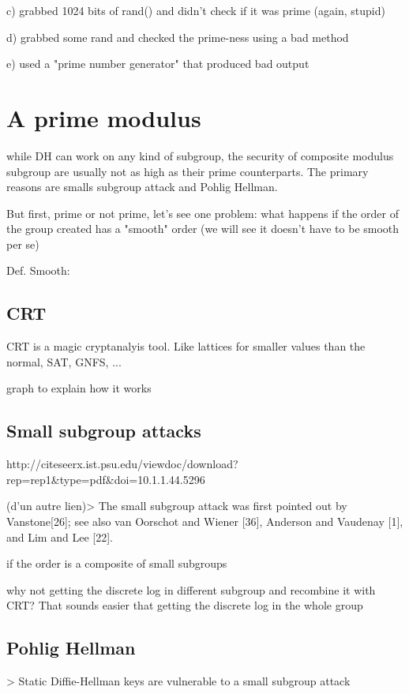 \documentclass[a4paper,11pt]{article}
\begin{document}
c) grabbed 1024 bits of rand() and didn't check if it was prime (again, stupid)

d) grabbed some rand and checked the prime-ness using a bad method

e) used a "prime number generator" that produced bad output


\section{A prime modulus}

while DH can work on any kind of subgroup, the security of composite modulus subgroup are usually not as high as their prime counterparts. The primary reasons are smalls subgroup attack and Pohlig Hellman.

But first, prime or not prime, let's see one problem: what happens if the order of the group created has a "smooth" order (we will see it doesn't have to be smooth per se)

Def. Smooth:

\subsection{CRT}

CRT is a magic cryptanalyis tool. Like lattices for smaller values than the normal, SAT, GNFS, ...

graph to explain how it works

\subsection{Small subgroup attacks}

http://citeseerx.ist.psu.edu/viewdoc/download?rep=rep1&type=pdf&doi=10.1.1.44.5296

(d'un autre lien)> The small subgroup attack was first pointed out by Vanstone[26]; see also van Oorschot and Wiener [36], Anderson and Vaudenay [1], and Lim and Lee [22].

if the order is a composite of small subgroups

why not getting the discrete log in different subgroup and recombine it with CRT? That sounds easier that getting the discrete log in the whole group

\subsection{Pohlig Hellman}

> Static Diffie-Hellman keys are vulnerable to a small subgroup attack
\end{document}

